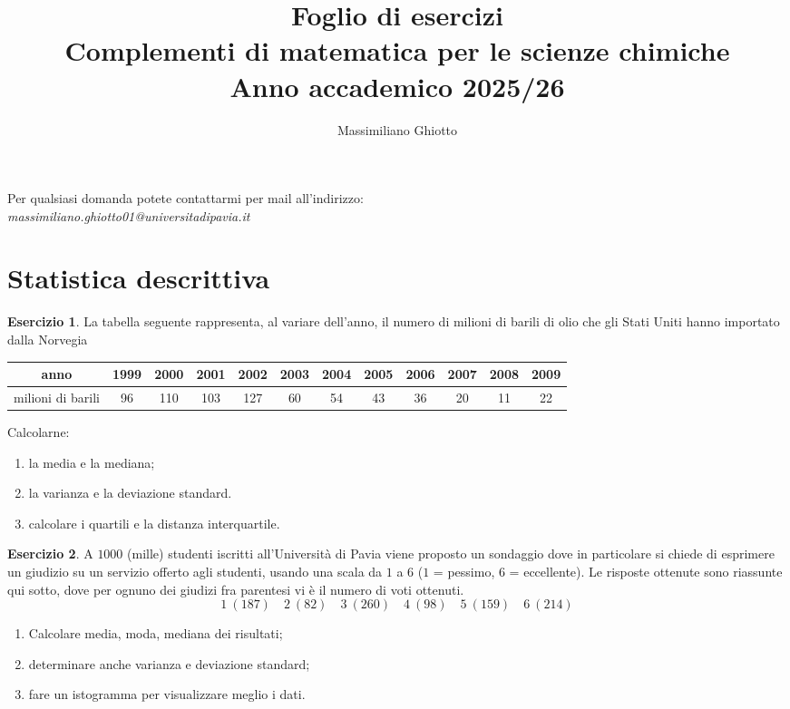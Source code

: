 \documentclass[12pt,a4paper]{article}
\title{Foglio di esercizi\\Complementi di matematica per le scienze chimiche\\ Anno accademico 2025/26}
\author{Massimiliano Ghiotto}
\date{}
\theoremstyle{definition}
\newtheorem{exe}{Esercizio}
\begin{document}
\maketitle
\noindent
Per qualsiasi domanda potete contattarmi per mail all'indirizzo:
\\
\textit{massimiliano.ghiotto01@universitadipavia.it}

\section{Statistica descrittiva}

\begin{exe}
	La tabella seguente rappresenta, al variare dell'anno, il numero di milioni di barili di olio che gli Stati Uniti hanno importato dalla Norvegia
	\begin{center}
		\begin{tabular}{|c|c|c|c|c|c|c|c|c|c|c|c|}
			\hline
			anno              & 1999 & 2000 & 2001 & 2002 & 2003 & 2004 & 2005 & 2006 & 2007 & 2008 & 2009 \\
			\hline
			milioni di barili & 96   & 110  & 103  & 127  & 60   & 54   & 43   & 36   & 20   & 11   & 22
			\\
			\hline
		\end{tabular}
	\end{center}
	Calcolarne:
	\begin{enumerate}
		\item  la media e la mediana;
		\item la varianza e la deviazione standard.
		\item calcolare i quartili e la distanza interquartile.
	\end{enumerate}
\end{exe}

\begin{exe}
	A $ 1000 $ (mille) studenti iscritti all'Università di Pavia viene proposto un sondaggio dove in particolare si chiede di esprimere un giudizio su un servizio offerto agli studenti, usando una scala da
	$ 1 $ a $ 6 $ ($ 1 $ = pessimo, $ 6 $ = eccellente). Le risposte ottenute sono riassunte qui sotto, dove per ognuno dei
	giudizi fra parentesi vi è il numero di voti ottenuti.
	\[
		1\ (187)\quad 2\ (82)\quad 3\ (260)\quad 4\ (98)\quad 5\ (159)\quad 6\ (214) \]
	\begin{enumerate}
		\item  Calcolare media, moda, mediana dei risultati;
		\item  determinare anche varianza e deviazione standard;
		\item  fare un istogramma per visualizzare meglio i dati.
	\end{enumerate}
\end{exe}
\end{document}
